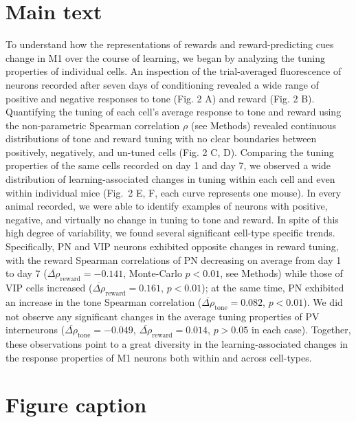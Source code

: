 \documentclass{article}
\begin{document}
\section{Main text}

To understand how the representations of rewards and reward-predicting cues
change in M1 over the course of learning, we began by analyzing the tuning
properties of individual cells.  An inspection of the trial-averaged
fluorescence of neurons recorded after seven days of conditioning revealed a
wide range of positive and negative responses to tone (Fig. 2 A) and reward
(Fig. 2 B). Quantifying the tuning of each cell's average response to tone and
reward using the non-parametric Spearman correlation $\rho$ (see Methods)
revealed continuous distributions of tone and reward tuning with no clear
boundaries between positively, negatively, and un-tuned cells (Fig. 2 C, D).
Comparing the tuning properties of the same cells recorded on day 1 and day 7,
we observed a wide distribution of learning-associated changes in tuning within
each cell and even within individual mice (Fig.\ 2 E, F, each curve represents
one mouse). In every animal recorded, we were able to identify examples of
neurons with positive, negative, and virtually no change in tuning to tone and
reward. In spite of this high degree of variability, we found several
significant cell-type specific trends. Specifically, PN and VIP neurons
exhibited opposite changes in reward tuning, with the reward Spearman
correlations of PN decreasing on average from day 1 to day 7 ($\overline{\Delta
\rho}_\text{reward} = -0.141$, Monte-Carlo $p<0.01$, see Methods) while those of
VIP cells increased ($\overline{\Delta \rho}_\text{reward} = 0.161$, $p<0.01$);
at the same time, PN exhibited an increase in the tone Spearman correlation
($\overline{\Delta \rho}_\text{tone} = 0.082$, $p<0.01$). We did not observe any
significant changes in the average tuning properties of PV interneurons
($\overline{\Delta \rho}_\text{tone} = -0.049$, $\overline{\Delta
\rho}_\text{reward} = 0.014$, $p > 0.05$ in each case).  Together, these
observations point to a great diversity in the learning-associated changes in
the response properties of M1 neurons both within and across cell-types.

\section{Figure caption}
\end{document}
